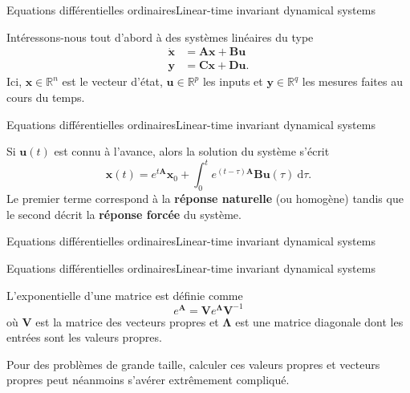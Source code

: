 \documentclass[usenames,dvipsnames,svgnames,10pt,aspectratio=169]{beamer}
\begin{document}
\begin{frame}[t, c]{Equations différentielles ordinaires}{Linear-time invariant dynamical systems}
  \begin{minipage}{.68\textwidth}
    Intéressons-nous tout d'abord à des systèmes linéaires du type
    \[
    \begin{aligned}
      \dot{\bm{x}} & = \bm{Ax} + \bm{Bu} \\
      \bm{y} & = \bm{Cx} + \bm{Du}.
    \end{aligned}
    \]
    Ici, $\bm{x} \in \mathbb{R}^n$ est le vecteur d'état, $\bm{u} \in \mathbb{R}^p$ les inputs et $\bm{y} \in \mathbb{R}^q$ les mesures faites au cours du temps.
  \end{minipage}%
  \hfill
  \begin{minipage}{.28\textwidth}
  \end{minipage}
\end{frame}

\begin{frame}[t, c]{Equations différentielles ordinaires}{Linear-time invariant dynamical systems}
  \begin{minipage}{.68\textwidth}
    Si $\bm{u}(t)$ est connu à l'avance, alors la solution du système s'écrit
    \[
    \bm{x}(t) = e^{t \bm{A}} \bm{x}_0 + \int_0^t e^{(t-\tau) \bm{A}} \bm{Bu}(\tau) \ \mathrm{d}\tau.
    \]
    Le premier terme correspond à la \alert{\textbf{réponse naturelle}} (ou homogène) tandis que le second décrit la \alert{\textbf{réponse forcée}} du système.
  \end{minipage}%
  \hfill
  \begin{minipage}{.28\textwidth}

  \end{minipage}
\end{frame}

\begin{frame}[t, c]{Equations différentielles ordinaires}{Linear-time invariant dynamical systems}
  
\end{frame}

\begin{frame}[t, c]{Equations différentielles ordinaires}{Linear-time invariant dynamical systems}
  \begin{minipage}{.68\textwidth}
    L'exponentielle d'une matrice est définie comme
    \[
    e^{\bm{A}} = \bm{V} e^{\boldsymbol{\Lambda}} \bm{V}^{-1}
    \]
    où $\bm{V}$ est la matrice des vecteurs propres et $\boldsymbol{\Lambda}$ est une matrice diagonale dont les entrées sont les valeurs propres.

    \bigskip

    Pour des problèmes de grande taille, calculer ces valeurs propres et vecteurs propres peut néanmoins s'avérer extrêmement compliqué.
  \end{minipage}%
  \hfill
  \begin{minipage}{.28\textwidth}
  \end{minipage}
\end{frame}
\end{document}
